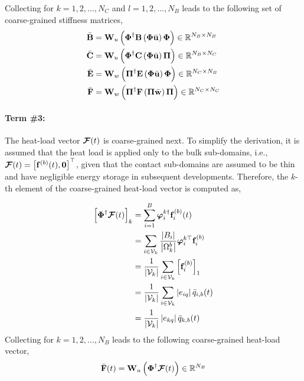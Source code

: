 \begin{tcolorbox}[enhanced,breakable,title=Coarse-Grained Thermal Conductivity Matrices]
\begin{equation}
    \end{equation}
    Collecting for $k=1,2,\dots,N_C$ and $l=1,2,\dots,N_B$ leads to the following set of coarse-grained stiffness matrices,
    \begin{subequations}
        \begin{align}
            \bar{\mathbf{B}} &= \mathbf{W}_u\left(\boldsymbol{\Phi}^{\dagger}\mathbf{B}\left(\boldsymbol{\Phi}\bar{\mathbf{u}}\right)\boldsymbol{\Phi}\right)\in\mathbb{R}^{N_B\times N_B}\\
            \bar{\mathbf{C}} &= \mathbf{W}_u\left(\boldsymbol{\Phi}^{\dagger}\mathbf{C}\left(\boldsymbol{\Phi}\bar{\mathbf{u}}\right)\boldsymbol{\Pi}\right)\in\mathbb{R}^{N_B\times N_C}\\
            \bar{\mathbf{E}} &= \mathbf{W}_w\left(\boldsymbol{\Pi}^{\dagger}\mathbf{E}\left(\boldsymbol{\Phi}\bar{\mathbf{u}}\right)\boldsymbol{\Phi}\right)\in\mathbb{R}^{N_C\times N_B}\\
            \bar{\mathbf{F}} &= \mathbf{W}_w\left(\boldsymbol{\Pi}^{\dagger}\mathbf{F}\left(\boldsymbol{\Pi}\bar{\mathbf{w}}\right)\boldsymbol{\Pi}\right)\in\mathbb{R}^{N_C\times N_C}
        \end{align}
    \end{subequations}
\end{tcolorbox}

\paragraph{Term \#3:} The heat-load vector $\boldsymbol{\mathcal{F}}(t)$ is coarse-grained next. To simplify the derivation, it is assumed that the heat load is applied only to the bulk sub-domains, i.e., $\boldsymbol{\mathcal{F}}(t) = \left[\mathbf{f}^{(b)}(t),\mathbf{0}\right]^\top$, given that the contact sub-domains are assumed to be thin and have negligible energy storage in subsequent developments. Therefore, the $k$-th element of the coarse-grained heat-load vector is computed as,
\begin{tcolorbox}[enhanced,breakable,title=Coarse-Grained Heat-Load Vector]
    \begin{subequations}
        \begin{align}
            \left[\boldsymbol{\Phi}^{\dagger}\boldsymbol{\mathcal{F}}(t)\right]_k &= \sum_{i=1}^{B}\boldsymbol{\varphi}_i^{k\dagger}\mathbf{f}_i^{(b)}(t)\\
            &= \sum_{i\in\mathcal{V}_k}\frac{\left|B_i\right|}{\left|\Omega_k^b\right|}\boldsymbol{\varphi}_i^{k\top}\mathbf{f}_i^{(b)}\\
            &= \frac{1}{\left|\mathcal{V}_k\right|}\sum_{i\in\mathcal{V}_k}\left[\mathbf{f}_i^{(b)}\right]_1\\
            &= \frac{1}{\left|\mathcal{V}_k\right|}\sum_{i\in\mathcal{V}_k}\left|e_{iq}\right| \bar{q}_{i,b}(t)\\
            &= \frac{1}{\left|\mathcal{V}_k\right|}\left|e_{kq}\right|\bar{q}_{k,b}(t)
        \end{align}
    \end{subequations}
    Collecting for $k=1,2,\dots,N_B$ leads to the following coarse-grained heat-load vector,
    \begin{equation}
        \bar{\mathbf{F}}(t) = \mathbf{W}_u\left(\boldsymbol{\Phi}^{\dagger}\boldsymbol{\mathcal{F}}(t)\right)\in\mathbb{R}^{N_B}
    \end{equation}
\end{tcolorbox}

